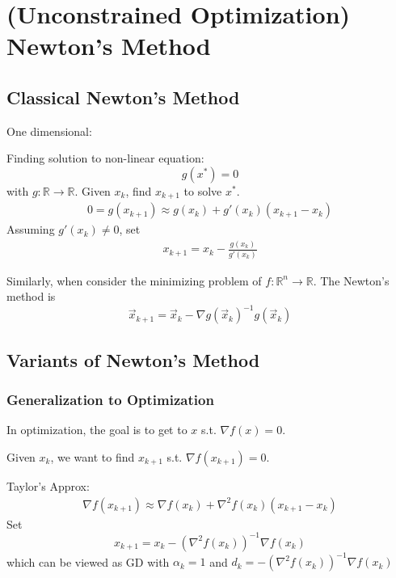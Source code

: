 \documentclass[11pt]{elegantbook}
\begin{document}
\chapter{(Unconstrained Optimization) Newton's Method}
\section{Classical Newton's Method}
\begin{definition}
    One dimensional:

    Finding solution to non-linear equation:
    $$g(x^*)=0$$ with $g:\mathbb{R} \rightarrow \mathbb{R}$. Given $x_k$, find $x_{k+1}$ to solve $x^*$.
    \begin{equation}
        \begin{aligned}
            0=g(x_{k+1})\approx g(x_k)+g'(x_k)(x_{k+1}-x_k)
        \end{aligned}
        \nonumber
    \end{equation}
    Assuming $g'(x_k)\neq 0$, set
    \begin{equation}
        \begin{aligned}
            x_{k+1}=x_k-\frac{g(x_k)}{g'(x_k)}
        \end{aligned}
        \nonumber
    \end{equation}
\end{definition}
Similarly, when consider the minimizing problem of $f: \mathbb{R}^n \rightarrow \mathbb{R}$.
The Newton's method is $$\vec{x}_{k+1}=\vec{x}_k- \nabla g(\vec{x}_{k})^{-1}g(\vec{x}_k)$$



\section{Variants of Newton's Method}
\subsection{Generalization to Optimization}
In optimization, the goal is to get to $x$ s.t. $\nabla f(x)=0$.

Given $x_k$, we want to find $x_{k+1}$ s.t. $\nabla f(x_{k+1})=0$.

Taylor's Approx: \begin{equation}
    \begin{aligned}
        \nabla f(x_{k+1})\approx \nabla f(x_k)+\nabla^2 f(x_k)(x_{k+1}-x_k)
    \end{aligned}
    \nonumber
\end{equation}
Set $$x_{k+1}=x_k-(\nabla^2 f(x_k))^{-1}\nabla f(x_k)$$
which can be viewed as GD with $\alpha_k=1$ and $d_k=-(\nabla^2 f(x_k))^{-1}\nabla f(x_k)$
\end{document}
